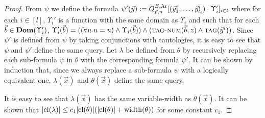 \documentclass[../main/thesis.tex]{subfiles}
\begin{document}
\begin{proof}
  From $\psi$ we define the formula $\psi' (\vec{y}) := Q^{E, \text{\upshape Ar}}_{\vec{p}, n}
  [(\vec{y}^i_1, \ldots, \vec{y}^i_{l_i}) \cdot \Upsilon_i']_{i \in l}$ where
  for each $i \in [l]$, $\Upsilon_i'$ is a function with the same domain as
  $\Upsilon_i$ and such that for each $\vec{b} \in \text{\textbf{Dom}}(\Upsilon_i')$,
  $\Upsilon_i' (\vec{b}) = ((\forall u . u = u) \land \Upsilon_i(\vec{b})) \land
  ({\normalfont\textsc{tag-num}}(\vec{b}, z) \land {\normalfont\textsc{tag}}(\vec{y}^i))$. Since $\psi'$ is
  defined from $\psi$ by taking conjunctions with tautologies, it is easy to see
  that $\psi$ and $\psi'$ define the same query. Let $\lambda$ be defined from
  $\theta$ by recursively replacing each sub-formula $\psi$ in $\theta$ with the
  corresponding formula $\psi'$. It can be shown by induction that, since we
  always replace a sub-formula $\psi$ with a logically equivalent one, $\lambda
  (\vec{x})$ and $\theta (\vec{x})$ define the same query.


  It is easy to see that $\lambda(\vec{x})$ has the same variable-width as
  $\theta(\vec{x})$. It can be shown that $\vert \mathrm{cl}(\lambda)\vert \leq c_1
  \vert \mathrm{cl}(\theta) \vert (\vert \mathrm{cl}(\theta) \vert + \mathrm{width}(\theta))$ for some
  constant $c_1$.
  



\end{proof}
\end{document}
